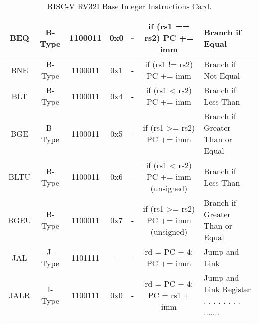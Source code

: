 \begin{table*}[h]
\begin{tabular*}{\textwidth}{|c|c|c|c|c|c|l|}
        BEQ         & B-Type & 1100011  & 0x0    & -      & if (rs1 == rs2) PC += imm & Branch if Equal                \\ \hline
        BNE         & B-Type & 1100011  & 0x1    & -      & if (rs1 != rs2) PC += imm & Branch if Not Equal            \\ \hline
        BLT         & B-Type & 1100011  & 0x4    & -      & if (rs1 < rs2) PC += imm & Branch if Less Than            \\ \hline
        BGE         & B-Type & 1100011  & 0x5    & -      & if (rs1 >= rs2) PC += imm & Branch if Greater Than or Equal \\ \hline
        BLTU        & B-Type & 1100011  & 0x6    & -      & if (rs1 < rs2) PC += imm (unsigned) & Branch if Less Than \\ \hline
        BGEU        & B-Type & 1100011  & 0x7    & -      & if (rs1 >= rs2) PC += imm (unsigned) & Branch if Greater Than or Equal \\ \hline
        JAL         & J-Type & 1101111  & -      & -      & rd = PC + 4; PC += imm & Jump and Link               \\ \hline
        JALR        & I-Type & 1100111  & 0x0    & -      & rd = PC + 4; PC = rs1 + imm & Jump and Link Register . . . .  . . . . ....... \\ \hline
    \end{tabular*}
    \caption{RISC-V RV32I Base Integer Instructions Card.}
    \label{tab:rv32i_card}
\end{table*}

